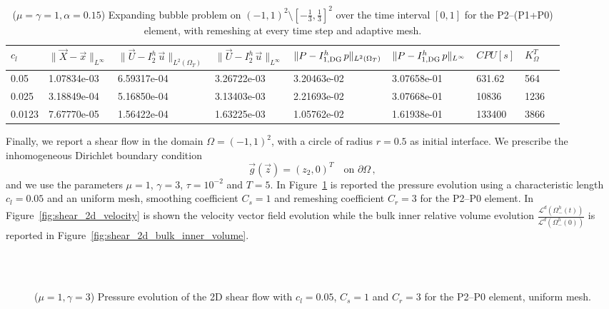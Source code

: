 \documentclass[a4paper,12pt,onecolumn]{article}
\newcommand{\errorXx}{\|\vec{X} - \vec{x}\|_{L^\infty}}
\newcommand{\LerrorUu}[1]{\|\vec U - I^h_{#1}\,\vec u\|_{L^2(\Omega_T)}}
\newcommand{\errorUu}[1]{\|\vec U - I^h_{#1}\,\vec u\|_{L^\infty}}
\newcommand{\errorPp}[1]{\|P - I^h_{#1}\,p\|_{L^\infty}}
\newcommand{\LerrorPp}[1]{\|P - I^h_{#1}\,p\|_{L^2(\Omega_T)}}
\begin{document}
\begin{table}
 \center
\begin{tabular}{llHlHllll}
\hline
$c_l$ & $\errorXx$ & $\LerrorUu2$ & $\errorUu2$ & $\LerrorPp{1,\rm{DG}}$ & $\errorPp{1,\rm{DG}}$ & $CPU[s]$ & $K_\Omega^T$\\
 & 1.07834e-03 & 6.59317e-04 & 3.26722e-03 & 3.20463e-02 & 3.07658e-01 & 631.62 & 564\\
0.025 & 3.18849e-04 & 5.16850e-04 & 3.13403e-03 & 2.21693e-02 & 3.07668e-01 & 10836 & 1236\\
0.0123 & 7.67770e-05 & 1.56422e-04 & 1.63225e-03 & 1.05762e-02 & 1.61938e-01 & 133400 & 3866\\
\hline
\end{tabular}
\caption{($\mu=\gamma=1,\alpha = 0.15$) Expanding bubble problem on $(-1,1)^2\setminus[-\frac{1}{3},\frac{1}{3}]^2$ over the time interval $[0,1]$ for the P2--(P1+P0) element, with remeshing at every time step and adaptive mesh.}
\label{tab:expandingbubble2Dp2p1p0adaptive}
\end{table}

Finally, we report a shear flow in the domain $\Omega=(-1,1)^2$, with a circle of radius $r=0.5$ as initial interface. We prescribe the inhomogeneous Dirichlet boundary condition
\begin{equation*}
\vec g(\vec z)=(z_2,0)^T\quad \mbox{on }\partial\Omega\,,
\end{equation*}
and we use the parameters $\mu=1$, $\gamma=3$, $\tau=10^{-2}$ and $T=5$. In Figure~\ref{fig:shear_2d} is reported the pressure evolution using a characteristic length $c_l=0.05$ and an uniform mesh, smoothing coefficient $C_s=1$ and remeshing coefficient $C_r=3$ for the P2--P0 element. In Figure~\ref{fig:shear_2d_velocity} is shown the velocity vector field evolution while the bulk inner relative volume evolution $\frac{\mathcal{L}^d(\Omega^h_-(t))}{\mathcal{L}^d(\Omega^h_-(0))}$ is reported in Figure~\ref{fig:shear_2d_bulk_inner_volume}.
\begin{figure}[htbp]
  \centering
  \quad
  \\
  \quad
  \\
  \caption{($\mu=1,\gamma=3$) Pressure evolution of the 2D shear flow with $c_l=0.05$, $C_s=1$ and $C_r=3$ for the P2--P0 element, uniform mesh.}
  \label{fig:shear_2d}
\end{figure}
\end{document}
